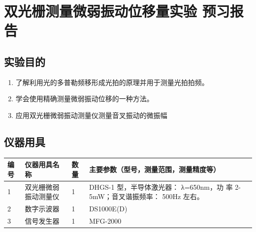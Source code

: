 \documentclass[dvipsnames, svgnames,a4paper,11pt]{article}
\begin{document}
	
	
	
	\setcounter{section}{0}
	\section{双光栅测量微弱振动位移量实验 \quad\heiti 预习报告}
	
	\subsection{实验目的}
	\begin{enumerate}
		\item 了解利用光的多普勒频移形成光拍的原理并用于测量光拍拍频。
		\item 学会使用精确测量微弱振动位移的一种方法。
		\item 应用双光栅微弱振动测量仪测量音叉振动的微振幅
	\end{enumerate}
	
	\subsection{仪器用具}
	\begin{table}[htbp]
		\centering
		\renewcommand\arraystretch{1.6}
		\begin{tabular}{p{}|p{}|p{}|p{}}
		
			\hline
			编号& 仪器用具名称 & 数量 &  主要参数（型号，测量范围，测量精度等） \\
			\hline
			1& 双光栅微弱振动测量仪 & 1 & DHGS-1 型，半导体激光器： λ=650nm，功
			率 2-5mW；音叉谐振频率： 500Hz 左右。\\
			
				2&数字示波器& 1 &  DS1000E(D)\\
			
				3& 信号发生器 & 1 &  MFG-2000\\
		
				
			\hline
		
		\end{tabular}
	\end{table}
	
\end{document}
